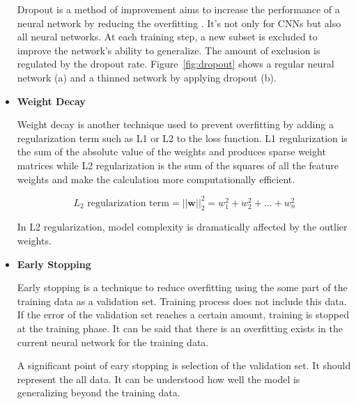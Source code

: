 \begin{itemize}
        

        Dropout is a method of improvement aims to increase the performance of a neural network by reducing the overfitting \cite{srivastava2014dropout}.
        It's not only for CNNs but also all neural networks. At each training step, a new subset is excluded to improve the network's ability to generalize.
        The amount of exclusion is regulated by the dropout rate.
        Figure~\ref{fig:dropout} shows a regular neural network (a) and a thinned network by applying dropout (b).

	\item \textbf{Weight Decay}

        Weight decay is another technique used to prevent overfitting by adding a regularization term such as L1 or L2 to the loss function.
        L1 regularization is the sum of the absolute value of the weights and produces sparse weight matrices while L2 regularization is the sum of the squares of all the feature weights and make the calculation more computationally efficient.

        $$L_2\text{ regularization term} = ||\boldsymbol w||_2^2 = {w_1^2 + w_2^2 + ... + w_n^2}$$

        In L2 regularization, model complexity is dramatically affected by the outlier weights.

	\item \textbf{Early Stopping}

        Early stopping is a technique to reduce overfitting using the some part of the training data as a validation set.
        Training process does not include this data.
        If the error of the validation set reaches a certain amount, training is stopped at the training phase.
        It can be said that there is an overfitting exists in the current neural network for the training data.

        A significant point of eary stopping is selection of the validation set.
        It should represent the all data. It can be understood how well the model is generalizing beyond the training data.

\end{itemize}

